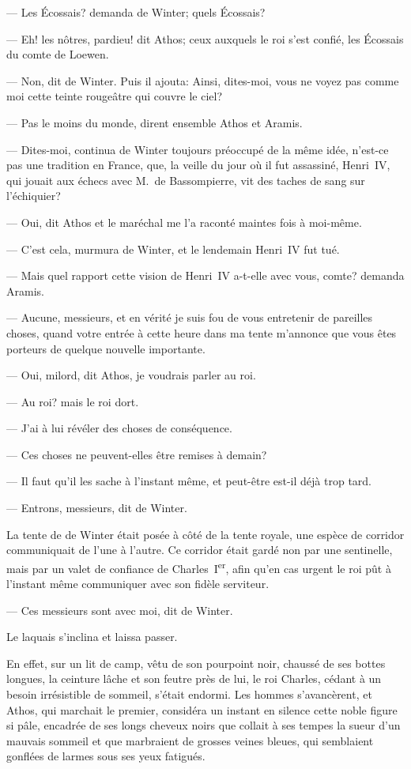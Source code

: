 — Les Écossais? demanda de Winter; quels Écossais?

— Eh! les nôtres, pardieu! dit Athos; ceux auxquels le roi s'est confié, les Écossais du comte de Loewen.

— Non, dit de Winter. Puis il ajouta: Ainsi, dites-moi, vous ne voyez pas comme moi cette teinte rougeâtre qui couvre le ciel?

— Pas le moins du monde, dirent ensemble Athos et Aramis.

— Dites-moi, continua de Winter toujours préoccupé de la même idée, n'est-ce pas une tradition en France, que, la veille du jour où il fut assassiné, Henri~IV, qui jouait aux échecs avec M.~de Bassompierre, vit des taches de sang sur l'échiquier?

— Oui, dit Athos et le maréchal me l'a raconté maintes fois à moi-même.

— C'est cela, murmura de Winter, et le lendemain Henri~IV fut tué.

— Mais quel rapport cette vision de Henri~IV a-t-elle avec vous, comte? demanda Aramis.

— Aucune, messieurs, et en vérité je suis fou de vous entretenir de pareilles choses, quand votre entrée à cette heure dans ma tente m'annonce que vous êtes porteurs de quelque nouvelle importante.

— Oui, milord, dit Athos, je voudrais parler au roi.

— Au roi? mais le roi dort.

— J'ai à lui révéler des choses de conséquence.

— Ces choses ne peuvent-elles être remises à demain?

— Il faut qu'il les sache à l'instant même, et peut-être est-il déjà trop tard.

— Entrons, messieurs, dit de Winter.

La tente de de Winter était posée à côté de la tente royale, une espèce de corridor communiquait de l'une à l'autre. Ce corridor était gardé non par une sentinelle, mais par un valet de confiance de Charles~I\textsuperscript{er}, afin qu'en cas urgent le roi pût à l'instant même communiquer avec son fidèle serviteur.

— Ces messieurs sont avec moi, dit de Winter.

Le laquais s'inclina et laissa passer.

En effet, sur un lit de camp, vêtu de son pourpoint noir, chaussé de ses bottes longues, la ceinture lâche et son feutre près de lui, le roi Charles, cédant à un besoin irrésistible de sommeil, s'était endormi. Les hommes s'avancèrent, et Athos, qui marchait le premier, considéra un instant en silence cette noble figure si pâle, encadrée de ses longs cheveux noirs que collait à ses tempes la sueur d'un mauvais sommeil et que marbraient de grosses veines bleues, qui semblaient gonflées de larmes sous ses yeux fatigués.

